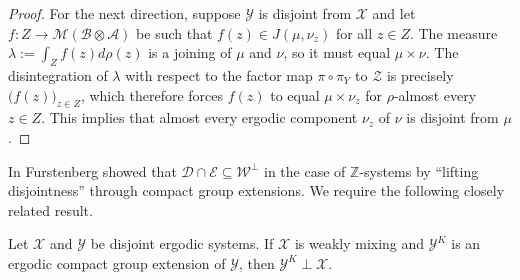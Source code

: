 \documentclass[graybox]{svmult}
\theoremstyle{definition}
\newcommand{\ZZ}{\mathcal{Z}}
\begin{document}
\begin{proof}
    For the next direction, suppose $\mathcal{Y}$ is disjoint from $\mathcal{X}$ and let $f:Z\rightarrow \mathcal{M}(\mathscr{B}\otimes\mathscr{A})$ be such that $f(z) \in J(\mu,\nu_z)$ for all $z \in Z$.
    The measure $\lambda := \int_Z f(z) d\rho(z)$ is a joining of $\mu$ and $\nu$, so it must equal $\mu\times\nu$.
    The disintegration of $\lambda$ with respect to the factor map $\pi\circ\pi_Y$ to $\ZZ$ is precisely $\big(f(z)\big)_{z\in Z}$, which therefore forces $f(z)$ to equal $\mu\times\nu_z$ for $\rho$-almost every $z\in Z$. 
    This implies that almost every ergodic component $\nu_z$ of $\nu$ is disjoint from $\mu$.
\end{proof}


In \cite{DisjointnessInErgodicTheory} Furstenberg showed that $\mathcal{D}\cap\mathcal{E} \subseteq \mathcal{W}^\perp$ in the case of $\mathbb{Z}$-systems by ``lifting disjointness'' through compact group extensions. 
We require the following closely related result.

\begin{theorem}\label{thm:FurstenbergLiftingDisjointness}
    Let $\mathcal{X}$ and $\mathcal{Y}$ be disjoint ergodic systems.
    If $\mathcal{X}$ is weakly mixing and $\mathcal{Y}^K$ is an ergodic compact group extension of $\mathcal{Y}$, then $\mathcal{Y}^K\perp\mathcal{X}$.
\end{theorem}
\end{document}

